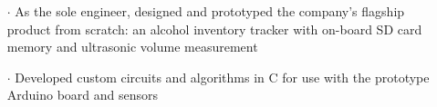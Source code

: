 \documentclass[a4paper, oneside, final]{scrartcl} %
\begin{document}
\begin{center}
\begin{itemize}
    \item[$\cdot$] As the sole engineer, designed and prototyped the company’s flagship product from scratch: an alcohol inventory tracker with on-board SD card memory and ultrasonic volume measurement  \\
    \item[$\cdot$] Developed custom circuits and algorithms in C for use with the prototype Arduino board and sensors\\

  \end{itemize}

  \vspace{-0.3cm}




\end{center}
\end{document}
